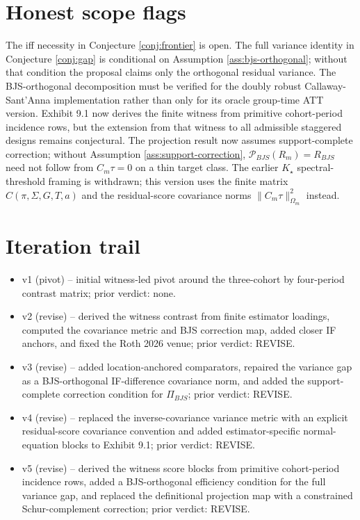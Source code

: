 \documentclass[11pt]{article}
\theoremstyle{definition}
\theoremstyle{plain}
\theoremstyle{remark}
\begin{document}
\section{Honest scope flags}
The iff necessity in Conjecture \ref{conj:frontier} is open. The full variance identity in Conjecture \ref{conj:gap} is conditional on Assumption \ref{ass:bjs-orthogonal}; without that condition the proposal claims only the orthogonal residual variance. The BJS-orthogonal decomposition must be verified for the doubly robust Callaway-Sant'Anna implementation rather than only for its oracle group-time ATT version. Exhibit 9.1 now derives the finite witness from primitive cohort-period incidence rows, but the extension from that witness to all admissible staggered designs remains conjectural. The projection result now assumes support-complete correction; without Assumption \ref{ass:support-correction}, \(\mathcal P_{BJS}(R_m)=R_{BJS}\) need not follow from \(C_m\tau=0\) on a thin target class. The earlier \(K_\star\) spectral-threshold framing is withdrawn; this version uses the finite matrix \(C(\pi,\Sigma,G,T,a)\) and the residual-score covariance norms \(\|C_m\tau\|_{\Omega_m}^2\) instead.

\section{Iteration trail}
\begin{itemize}[leftmargin=*]
\item v1 (pivot) -- initial witness-led pivot around the three-cohort by four-period contrast matrix; prior verdict: none.
\item v2 (revise) -- derived the witness contrast from finite estimator loadings, computed the covariance metric and BJS correction map, added closer IF anchors, and fixed the Roth 2026 venue; prior verdict: REVISE.
\item v3 (revise) -- added location-anchored comparators, repaired the variance gap as a BJS-orthogonal IF-difference covariance norm, and added the support-complete correction condition for \(\Pi_{BJS}\); prior verdict: REVISE.
\item v4 (revise) -- replaced the inverse-covariance variance metric with an explicit residual-score covariance convention and added estimator-specific normal-equation blocks to Exhibit 9.1; prior verdict: REVISE.
\item v5 (revise) -- derived the witness score blocks from primitive cohort-period incidence rows, added a BJS-orthogonal efficiency condition for the full variance gap, and replaced the definitional projection map with a constrained Schur-complement correction; prior verdict: REVISE.
\end{itemize}
\end{document}
